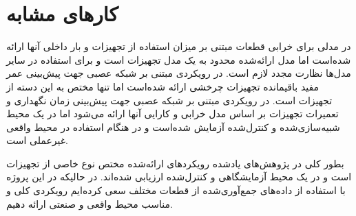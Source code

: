 \section{کارهای مشابه}
در \cite{tinga2010application} مدلی برای خرابی قطعات مبتنی بر میزان استفاده از تجهیزات و بار داخلی آنها ارائه شده‌است اما مدل ارائه‌شده محدود به یک مدل تجهیزات است و برای استفاده در سایر مدل‌ها نظارت مجدد لازم است. در \cite{wu2007neural} رویکردی مبتنی بر شبکه عصبی جهت پیش‌بینی عمر مفید باقیمانده تجهیزات چرخشی ارائه شده‌است اما تنها مختص به این دسته از تجهیزات است. در \cite{kaiser2009predictive} رویکردی مبتنی بر شبکه عصبی جهت پیش‌بینی زمان نگهداری و تعمیرات تجهیزات بر اساس مدل خرابی و کارایی آنها ارائه می‌شود اما در یک محیط شبیه‌سازی‌شده و کنترل‌شده آزمایش شده‌است و در هنگام استفاده در محیط واقعی غیرعملی است.

بطور کلی در پژوهش‌های یادشده رویکرد‌های ارائه‌شده مختص نوع خاصی از تجهیزات است و در یک محیط آزمایشگاهی و کنترل‌شده ارزیابی شده‌اند. در حالیکه در این پروژه با استفاده از داده‌های جمع‌آوری‌شده از قطعات مختلف سعی کرده‌ایم رویکردی کلی و مناسب محیط واقعی و صنعتی ارائه دهیم.
